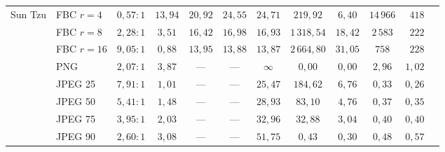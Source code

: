 \begin{table}[H]
\begin{tabular}{llccccccccrr}
        Sun Tzu    & FBC $r{=}4$  & $0,57{:}1$  & $13,94$ & $20,92$ & $24,55$ & $24,71$ & $219,92$  & $6,40$  & $14\,966$ & $418$   \\
                   & FBC $r{=}8$  & $2,28{:}1$  & $3,51$  & $16,42$ & $16,98$ & $16,93$ & $1\,318,54$ & $18,42$ & $2\,583$ & $222$ \\
                   & FBC $r{=}16$ & $9,05{:}1$  & $0,88$  & $13,95$ & $13,88$ & $13,87$ & $2\,664,80$ & $31,05$ & $758$   & $228$ \\
                   & PNG          & $2,07{:}1$  & $3,87$  & ---     & ---     & $\infty$ & $0,00$   & $0,00$  & $2,96$    & $1,02$  \\
                   & JPEG 25      & $7,91{:}1$  & $1,01$  & ---     & ---     & $25,47$ & $184,62$  & $6,76$  & $0,33$    & $0,26$  \\
                   & JPEG 50      & $5,41{:}1$  & $1,48$  & ---     & ---     & $28,93$ & $83,10$   & $4,76$  & $0,37$    & $0,35$  \\
                   & JPEG 75      & $3,95{:}1$  & $2,03$  & ---     & ---     & $32,96$ & $32,88$   & $3,04$  & $0,40$    & $0,40$  \\
                   & JPEG 90      & $2,60{:}1$  & $3,08$  & ---     & ---     & $51,75$ & $0,43$    & $0,30$  & $0,48$    & $0,57$  \\

        \bottomrule
    \end{tabular}
\end{table}
